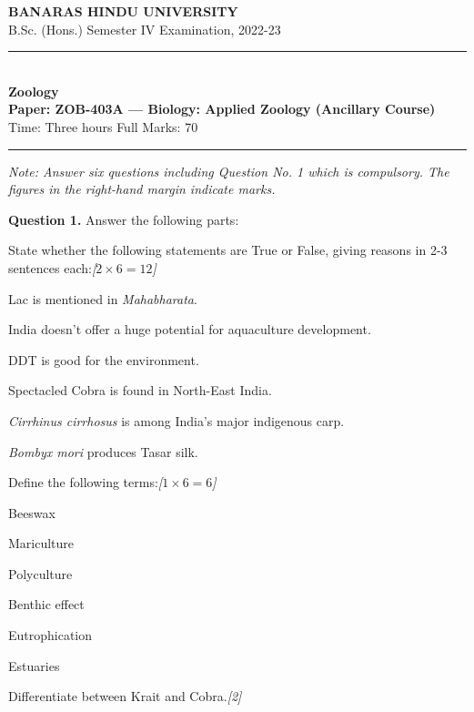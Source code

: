 \documentclass[11pt,a4paper]{article}
\newcommand{\pts}[1]{\hfill   \textit{[#1]}}
\begin{document}
\begin{center}
  {\large\bfseries BANARAS HINDU UNIVERSITY}\\[2pt]
  {\normalsize B.Sc. (Hons.) Semester IV Examination, 2022-23}\\[6pt]
  \rule{0.8\linewidth}{0.5pt}\\[6pt]
  {\large\bfseries Zoology}\\[4pt]
  {\large\bfseries Paper: ZOB-403A --- Biology: Applied Zoology (Ancillary Course)}\\[4pt]
  {\normalsize Time: Three hours \hfill Full Marks: 70}
\end{center}

\rule{\linewidth}{0.4pt}

\smallskip



\noindent   \textit{Note: Answer six questions including Question No. 1 which is compulsory. The figures in the right-hand margin indicate marks.}

\bigskip

\medskip


\noindent   \textbf{Question 1.} Answer the following parts:

\begin{parts}
  \item State whether the following statements are True or False, giving reasons in 2-3 sentences each:\pts{$2  \times 6 = 12$}
  
\begin{parts}
    \item Lac is mentioned in   \textit{Mahabharata}.
    \item India doesn't offer a huge potential for aquaculture development.
    \item DDT is good for the environment.
    \item Spectacled Cobra is found in North-East India.
    \item   \textit{Cirrhinus cirrhosus} is among India's major indigenous carp.
    \item   \textit{Bombyx mori} produces Tasar silk.
  \end{parts}
  
  \item Define the following terms:\pts{$1  \times 6 = 6$}
  
\begin{parts}
    \item Beeswax
    \item Mariculture
    \item Polyculture
    \item Benthic effect
    \item Eutrophication
    \item Estuaries
  \end{parts}

  \item Differentiate between Krait and Cobra.\pts{2}
\end{parts}
\end{document}
